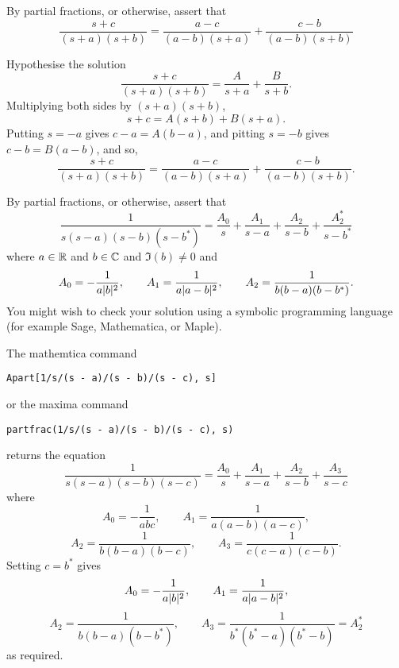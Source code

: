 \begin{excersizelist}
\item \label{exer:partialfracsecondorder} By partial fractions, or otherwise, assert that
\[
\frac{s + c}{(s+a)(s+b)} = \frac{a-c}{(a-b)(s+a)} + \frac{c-b}{(a-b)(s+b)}
\]
\begin{solution}
Hypothesise the solution
\[
\frac{s + c}{(s+a)(s+b)} = \frac{A}{s+a} + \frac{B}{s+b}.
\]
Multiplying both sides by $(s+a)(s+b)$,
\[
s+c = A(s+b) + B(s+a).
\]
Putting $s = -a$ gives $c-a = A(b-a)$, and pitting $s=-b$ gives $c-b = B(a-b)$, and so,
\[
\frac{s+c}{(s+a)(s+b)} = \frac{a-c}{(a-b)(s+a)} + \frac{c-b}{(a-b)(s+b)}.
\]
\end{solution}

\begin{hardexercise}

\item \label{exer:partialfracfourthorder} By partial fractions, or otherwise, assert that
\[
\frac{1}{s(s-a)(s-b)(s-b^*)} = \frac{A_0}{s} + \frac{A_1}{s-a} + \frac{A_2}{s-b} + \frac{A_2^*}{s-b^*}
\]
where $a \in {\mathbb R}$ and $b \in {\mathbb C}$ and $\Im(b) \neq 0$ and
\[
A_0 = -\frac{1}{a\vert b \vert^2}, \qquad A_1 =  \frac{1}{a\vert a - b \vert^2}, \qquad A_2 = \frac{1}{b(b-a)(b-b^*)}.
\]
You might wish to check your solution using a symbolic programming language (for example Sage, Mathematica, or Maple).
\begin{solution}
The mathemtica command
\begin{verbatim}
Apart[1/s/(s - a)/(s - b)/(s - c), s]
\end{verbatim}
or the maxima command
\begin{verbatim}
partfrac(1/s/(s - a)/(s - b)/(s - c), s)
\end{verbatim}
returns the equation
\[
\frac{1}{s(s-a)(s-b)(s-c)} = \frac{A_0}{s} + \frac{A_1}{s-a} + \frac{A_2}{s-b} + \frac{A_3}{s-c}
\]
where
\[
A_0 = -\frac{1}{abc}, \qquad A_1 =  \frac{1}{a (a-b) (a-c)}, 
\]
\[
A_2 = \frac{1}{b (b-a) (b-c)}, \qquad A_3 = \frac{1}{c (c-a) (c-b)}.
\]
Setting $c = b^*$ gives
\[
A_0 = -\frac{1}{a\vert b \vert^2}, \qquad A_1 =  \frac{1}{a\vert a - b \vert^2}, 
\]
\[ 
A_2 = \frac{1}{b(b-a)(b-b^*)}, \qquad A_3 = \frac{1}{b^*(b^*-a)(b^*-b)} = A_2^*
\]
as required.
\end{solution}

\end{hardexercise}


\end{excersizelist}
